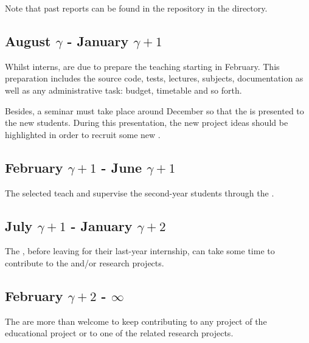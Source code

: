 \begin{multicols}{2}
Note that past reports can be found in the  repository in the
 directory.

%
%

\subsection{August $\gamma$ - January $\gamma + 1$}

Whilst interns,  are due to prepare the teaching
starting in February. This preparation includes the source code, tests,
lectures, subjects, documentation as well as any administrative task: budget,
timetable and so forth.

Besides, a seminar must take place around December so that the  is presented to the new students. During this
presentation, the new  project ideas should be highlighted in
order to recruit some new .

%
%

\subsection{February $\gamma + 1$ - June $\gamma + 1$}

The selected  teach and supervise the second-year
students through the .

%
%

\subsection{July $\gamma + 1$ - January $\gamma + 2$}

The , before leaving  for their
last-year internship, can take some time to contribute to the 
and/or  research projects.

%
%

\subsection{February $\gamma + 2$ - $\infty$}

The  are more than welcome to keep contributing
to any project of the  educational project or to one of the
related research projects.


\end{multicols}
